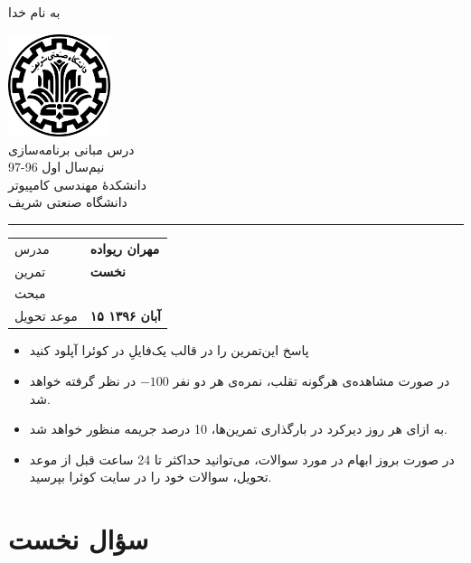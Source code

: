 \documentclass[9pt]{article}
\begin{document}
	\thispagestyle{empty}
	
	\begin{center}
		به نام خدا
	
		\vskip 80mm
	
		\includegraphics[width=3cm]{sharif-logo}\\
		\huge{درس مبانی برنامه‌سازی} \\
		\bigskip
		\large{نیم‌سال اول 96-97} \\
		\medskip
		دانشکدهٔ مهندسی کامپیوتر\\
		دانشگاه صنعتی شریف \\
		\bigskip
		\hrule
		\medskip
		
		{\def\arraystretch{1.3}
		\begin{tabular}{>{\raggedright}p{} >{\raggedleft}p{}}
			مدرس & \textbf{مهران ریواده} \tabularnewline
			تمرین & \textbf{نخست} \tabularnewline
			مبحث & \textbf{\rl{IO}} \tabularnewline
			موعد تحویل & \textbf{۱۵ آبان ۱۳۹۶} \tabularnewline

		\end{tabular}}


		\bigskip


	\end{center}
	\begin{large}
	\begin{itemize}
	\item{پاسخ این‌تمرین را در قالب یک‌فایلِ  در کوئرا آپلود کنید}
	\item{در صورت مشاهده‌ی هرگونه تقلب، نمره‌ی هر دو نفر $-100$ در نظر گرفته خواهد شد.}
	\item{به ازای هر روز دیرکرد در بارگذاری تمرین‌ها، 10 درصد جریمه منظور خواهد شد.}
	\item{در صورت بروز ابهام در مورد سوالات، می‌توانید حداکثر تا 24 ساعت قبل از موعد تحویل، سوالات خود را در سایت کوئرا بپرسید.}
	\end{itemize}
	\end{large}
	\pagebreak
	

\pagestyle{fancy}

\section*{سؤال نخست}
\end{document}
